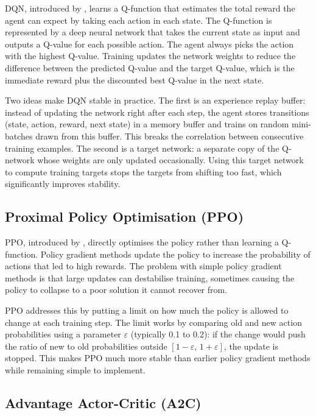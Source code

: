 DQN, introduced by \citet{mnih2015}, learns a Q-function that estimates the total reward
the agent can expect by taking each action in each state. The Q-function is represented
by a deep neural network that takes the current state as input and outputs a Q-value for
each possible action. The agent always picks the action with the highest Q-value.
Training updates the network weights to reduce the difference between the predicted
Q-value and the target Q-value, which is the immediate reward plus the discounted best
Q-value in the next state.

Two ideas make DQN stable in practice. The first is an experience replay buffer: instead
of updating the network right after each step, the agent stores transitions (state,
action, reward, next state) in a memory buffer and trains on random mini-batches drawn
from this buffer. This breaks the correlation between consecutive training examples. The
second is a target network: a separate copy of the Q-network whose weights are only
updated occasionally. Using this target network to compute training targets stops the
targets from shifting too fast, which significantly improves stability.

\subsection{Proximal Policy Optimisation (PPO)}
\label{subsec:bg:ppo}

PPO, introduced by \citet{schulman2017}, directly optimises the policy rather than
learning a Q-function. Policy gradient methods update the policy to increase the
probability of actions that led to high rewards. The problem with simple policy gradient
methods is that large updates can destabilise training, sometimes causing the policy to
collapse to a poor solution it cannot recover from.

PPO addresses this by putting a limit on how much the policy is allowed to change at
each training step. The limit works by comparing old and new action probabilities
using a parameter $\varepsilon$ (typically 0.1 to 0.2): if the change would push the
ratio of new to old probabilities outside $[1-\varepsilon,\, 1+\varepsilon]$, the
update is stopped. This makes PPO much more stable than earlier policy gradient
methods while remaining simple to implement.

\subsection{Advantage Actor-Critic (A2C)}
\label{subsec:bg:a2c}

